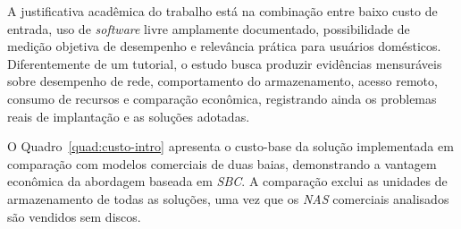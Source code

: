 A justificativa acadêmica do trabalho está na combinação entre baixo custo de entrada, uso de \textit{software} livre amplamente documentado, possibilidade de medição objetiva de desempenho e relevância prática para usuários domésticos. Diferentemente de um tutorial, o estudo busca produzir evidências mensuráveis sobre desempenho de rede, comportamento do armazenamento, acesso remoto, consumo de recursos e comparação econômica, registrando ainda os problemas reais de implantação e as soluções adotadas.

O Quadro~\ref{quad:custo-intro} apresenta o custo-base da solução implementada em comparação com modelos comerciais de duas baias, demonstrando a vantagem econômica da abordagem baseada em \textit{SBC}. A comparação exclui as unidades de armazenamento de todas as soluções, uma vez que os \textit{NAS} comerciais analisados são vendidos sem discos.


